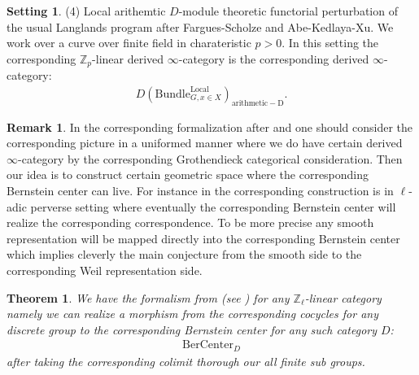 \documentclass[12pt]{book}
\newtheorem{theorem}{Theorem}
\theoremstyle{definition}
\newtheorem{setting}{Setting}
\newtheorem{remark}{Remark}
\begin{document}
\begin{setting}
(4) Local arithemtic $D$-module theoretic functorial perturbation of the usual Langlands program after Fargues-Scholze and Abe-Kedlaya-Xu. We work over a curve over finite field in charateristic $p>0$. In this setting the corresponding $\mathbb{Z}_p$-linear derived $\infty$-category is the corresponding derived $\infty$-category:
\begin{align}
D(\mathrm{Bundle}^\mathrm{Local}_{G,x\in X})_{\mathrm{arithmetic-D}}.
\end{align}

\end{setting}

\begin{remark}
In the corresponding formalization after \cite{VLa} and \cite{FS} one should consider the corresponding picture in a uniformed manner where we do have certain derived $\infty$-category by the corresponding Grothendieck categorical consideration. Then our idea is to construct certain geometric space where the corresponding Bernstein center can live. For instance in \cite{VLa} the corresponding construction is in $\ell$-adic perverse setting where eventually the corresponding Bernstein center will realize the corresponding correspondence. To be more precise any smooth representation will be mapped directly into the corresponding Bernstein center which implies cleverly the main conjecture from the smooth side to the corresponding Weil representation side.
\end{remark}



\begin{theorem}
We have the formalism from \cite{VLa} (see \cite[Chapter VIII Theorem 4.1 and Chapter IX Proposition 4.1]{FS}) for any $\mathbb{Z}_\ell$-linear category namely we can realize a morphism from the corresponding cocycles for any discrete group to the corresponding Bernstein center for any such category $D$:
\begin{align}
\mathrm{BerCenter}_D
\end{align}
after taking the corresponding colimit thorough our all finite sub groups. 
\end{theorem}
\end{document}
